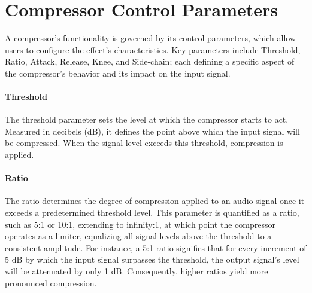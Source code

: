 \documentclass[10pt]{article}
\begin{document}
\begin{multicols*}{2}
\begin{minipage}{\linewidth}
            \label{fig:comp-ratio}
        \end{minipage}

        \section{Compressor Control Parameters}
            A compressor's functionality is governed by its control parameters, which allow users to configure the effect's characteristics. Key parameters include Threshold, Ratio, Attack, Release, Knee, and Side-chain; each defining a specific aspect of the compressor's behavior and its impact on the input signal.

            \paragraph{Threshold}
                The threshold parameter sets the level at which the compressor starts to act. Measured in decibels (dB), it defines the point above which the input signal will be compressed. When the signal level exceeds this threshold, compression is applied.

            \paragraph{Ratio}
                The ratio determines the degree of compression applied to an audio signal once it exceeds a predetermined threshold level. This parameter is quantified as a ratio, such as 5:1 or 10:1, extending to infinity:1, at which point the compressor operates as a limiter, equalizing all signal levels above the threshold to a consistent amplitude. For instance, a 5:1 ratio signifies that for every increment of 5 dB by which the input signal surpasses the threshold, the output signal's level will be attenuated by only 1 dB. Consequently, higher ratios yield more pronounced compression.


\end{multicols*}
\end{document}
